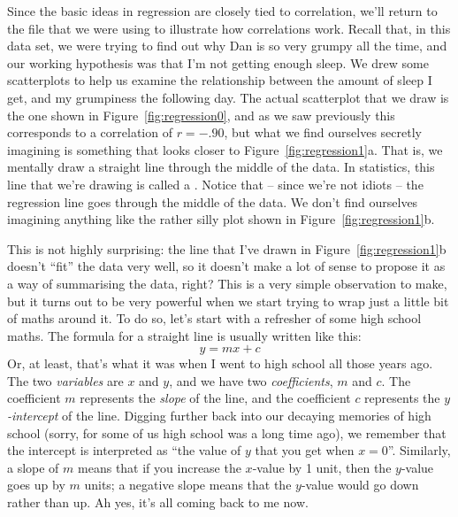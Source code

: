 Since the basic ideas in regression are closely tied to correlation, we'll return to the  file that we were using to illustrate how correlations work. Recall that, in this data set, we were trying to find out why Dan is so very grumpy all the time, and our working hypothesis was that I'm not getting enough sleep. We drew some scatterplots to help us examine the relationship between the amount of sleep I get, and my grumpiness the following day. The actual scatterplot that we draw is the one shown in Figure~\ref{fig:regression0}, and as we saw previously this corresponds to a correlation of $r=-.90$, but what we find ourselves secretly imagining is something that looks closer to Figure~\ref{fig:regression1}a. That is, we mentally draw a straight line through the middle of the data. In statistics, this line that we're drawing is called a . Notice that -- since we're not idiots -- the regression line goes through the middle of the data. We don't find ourselves imagining anything like the rather silly plot shown in Figure~\ref{fig:regression1}b. 

This is not highly surprising: the line that I've drawn in Figure~\ref{fig:regression1}b doesn't ``fit'' the data very well, so it doesn't make a lot of sense to propose it as a way of summarising the data, right? This is a very simple observation to make, but it turns out to be very powerful when we start trying to wrap just a little bit of maths around it. To do so, let's start with a refresher of some high school maths. The formula for a straight line is usually written like this:
$$
y = mx + c
$$ 
Or, at least, that's what it was when I went to high school all those years ago. The two {\it variables} are $x$ and $y$, and we have two {\it coefficients}, $m$ and $c$. The coefficient $m$ represents the {\it slope} of the line, and the coefficient $c$ represents the {\it $y$-intercept} of the line. Digging further back into our decaying memories of high school (sorry, for some of us high school was a long time ago), we remember that the intercept is interpreted as ``the value of $y$ that you get when $x=0$''. Similarly, a slope of $m$ means that if you increase the $x$-value by 1 unit, then the $y$-value goes up by $m$ units; a negative slope means that the $y$-value would go down rather than up. Ah yes, it's all coming back to me now. 

